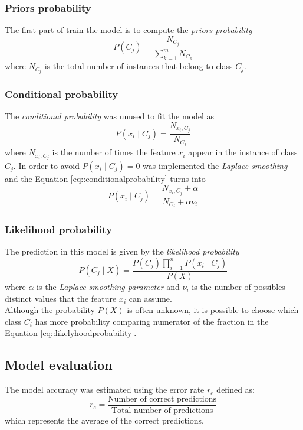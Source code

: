 \documentclass[9pt,technote]{IEEEtran}
\begin{document}
\subsubsection{Priors probability}
The first part of train the model is to compute the \textit{priors probability}
\begin{equation*}
	P(C_j) = \frac{N_{C_j}}{\sum_{k=1}^m N_{C_k}}
\end{equation*}
where $N_{C_j}$ is the total number of instances that belong to class $C_j$.
\subsubsection{Conditional probability}
The \textit{conditional probability} was unused to fit the model as
\begin{equation}
	P(x_i\mid C_j) = \frac{N_{x_i,C_j}}{N_{C_j}}
	\label{eq::conditionalprobability} 
\end{equation}
where $N_{x_i,C_j}$ is the number of times the feature $x_i$ appear in the instance of class $C_j$.
In order to avoid $P(x_i\mid C_j) = 0$ was implemented the  \textit{Laplace smoothing} and the Equation \ref{eq::conditionalprobability} turns into
\begin{equation*}
	P(x_i\mid C_j) = \frac{N_{x_i,C_j} + \alpha}{N_{C_j} + \alpha\nu_i}
\end{equation*}

\subsubsection{Likelihood probability}
The prediction in this model is given by the \textit{likelihood probability}
\begin{equation}
	P(C_j\mid X) = \frac{P(C_j)\prod_{i=1}^n P(x_i\mid C_j)}{P(X)}
	\label{eq::likelyhoodprobability}
\end{equation}
where $\alpha$ is the \textit{Laplace smoothing parameter} and $\nu_i$ is the number of possibles distinct values that the feature $x_i$ can assume.\\
Although the probability $P(X)$ is often unknown, it is possible to choose which class $C_i$ has more probability comparing numerator of the fraction in the Equation \ref{eq::likelyhoodprobability}.

\subsection{Model evaluation}
The model accuracy was estimated using the error rate $r_e$ defined as:
\begin{equation*}
	r_e = \frac{\text{Number of correct predictions}}{\text{Total number of predictions}}
\end{equation*}
which represents the average of the correct predictions.
\end{document}
